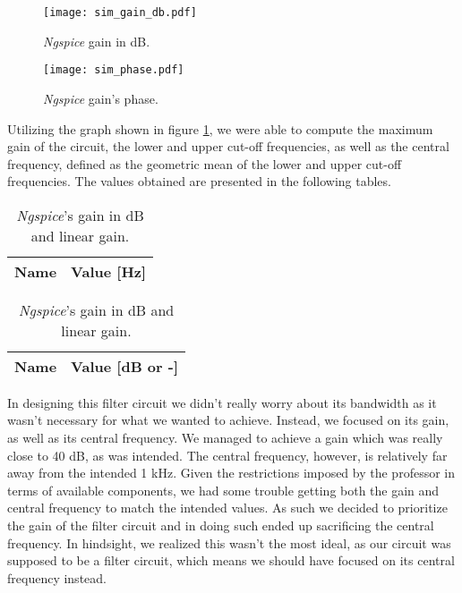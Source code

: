 \vspace{-0.25cm}
\begin{figure}[h] \centering
  \texttt{[image: sim\_gain\_db.pdf]}
  \caption{\emph{Ngspice} gain in dB.}
  \label{fig:NgspiceGain_dB}
\end{figure}

\begin{figure}[h] \centering
  \texttt{[image: sim\_phase.pdf]}
  \caption{\emph{Ngspice} gain's phase.}
  \label{fig:NgspicePhase}
\end{figure}

Utilizing the graph shown in figure \ref{fig:NgspiceGain_dB}, we were able to compute the maximum gain of the circuit, the lower
and upper cut-off frequencies, as well as the central frequency, defined as
the geometric mean of the lower and upper cut-off frequencies. The values obtained are presented in the following tables.

\begin{table}[h]
  \parbox{.45\linewidth}{
    \centering
    \begin{tabular}{|c|c|}
      \hline
      {\bf Name} & {\bf Value [Hz]} \\ \hline
      
    \end{tabular}
    \caption{\emph{Ngspice}'s cut-off frequencies and central frequency.}
  }
  \hfill
  \parbox{.45\linewidth}{
    \centering
    \begin{tabular}{|c|c|}
      \hline
      {\bf Name} & {\bf Value [dB or -]} \\ \hline
      
    \end{tabular}
    \caption{\emph{Ngspice}'s gain in dB and linear gain.}
  }
\end{table}

In designing this filter circuit we didn't really worry about its bandwidth as it wasn't necessary for what we wanted to achieve. Instead, we focused
on its gain, as well as its central frequency. We managed to achieve a gain which was really close to 40 dB, as was intended. The central frequency, however,
is relatively far away from the intended 1 kHz. Given the restrictions imposed by the professor in terms of available components, we had some 
trouble getting both the gain and central frequency to match the intended values. As such we decided to prioritize the gain of the filter
circuit and in doing such ended up sacrificing the central frequency. In hindsight, we realized this wasn't the most ideal, as our circuit was supposed
to be a filter circuit, which means we should have focused on its central frequency instead.


